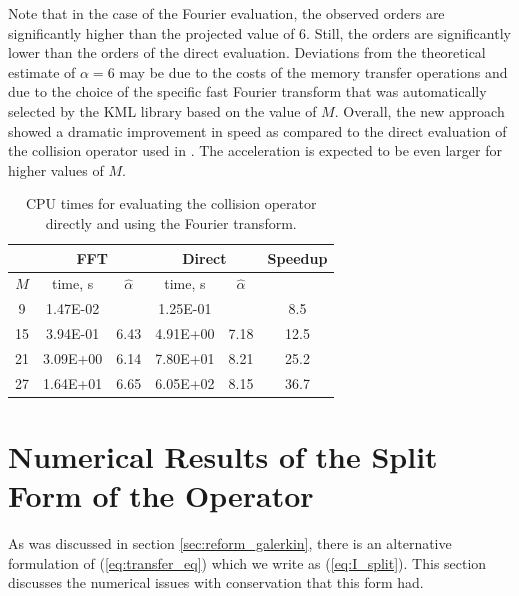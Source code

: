 \documentclass[12pt]{CSUNthesis}
\begin{document}
Note that in the case of the Fourier evaluation, the observed orders are significantly 
higher than the projected value of 6. Still, the orders are significantly lower than the 
orders of the direct evaluation. Deviations from the theoretical estimate of 
$\alpha=6$ may be due to the costs of the memory transfer operations and due to the choice of 
the specific fast Fourier transform that was automatically selected by the KML library based 
on the value of $M$. Overall, the new approach showed a dramatic improvement in speed as 
compared to the direct evaluation of the collision operator used in \cite{AlekseenkoJosyula2012}.
The acceleration is expected to be even larger for higher values of $M$.

\begin{table}[h]
  \centering
  \begin{tabular}[c]{ c c c c c c}
    \hline 
    & \multicolumn{2}{c|}{FFT} & \multicolumn{2}{c|}{Direct} & Speedup\\
    \hline
    $M$ & time, s & $\hat{\alpha}$ & time, s & $\hat{\alpha}$ &  \\
    \hline
    9   & 1.47E-02 &         & 1.25E-01 &       & 8.5  \\
    15  & 3.94E-01 &  6.43   & 4.91E+00 &  7.18 & 12.5 \\
    21  & 3.09E+00 &  6.14   & 7.80E+01 &  8.21 & 25.2 \\
    27  & 1.64E+01 &  6.65   & 6.05E+02 &  8.15 & 36.7 \\
    \hline
  \end{tabular}
\caption{\label{tab:01} CPU times for evaluating the collision operator directly and using the Fourier transform.}
\end{table}



\section{Numerical Results of the Split Form of the Operator}
As was discussed in section \ref{sec:reform_galerkin}, there is an alternative formulation of (\ref{eq:transfer_eq}) which we write as (\ref{eq:I_split}). This section discusses the numerical issues with conservation that this form had.
\end{document}

